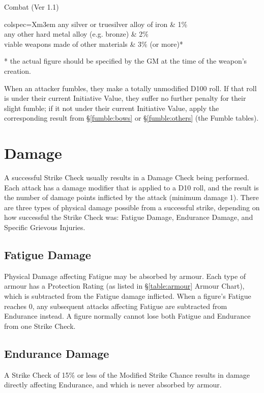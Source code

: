 \begin{Chapter}{Combat (Ver 1.1)}
\begin{dqtblr}{colspec={Xm{3em}}}
any silver or truesilver alloy of iron		& 1\% \\
any other hard metal alloy (e.g. bronze)	& 2\% \\ 
viable weapons made of other materials		& 3\% (or more)* \\
\end{dqtblr}

* the actual figure should be specified by the GM at the time of the
weapon’s creation.


When an attacker fumbles, they make a totally unmodified D100 roll.
If that roll is under their current Initiative Value, they suffer no
further penalty for their slight fumble; if it not under their current
Initiative Value, apply the corresponding result from
\S\ref{fumble:bows} or \S\ref{fumble:others} (the Fumble tables).

\section{Damage}
\label{combat:damage}

A successful Strike Check usually results in a Damage Check being
performed. Each attack has a damage modifier that is applied to a D10
roll, and the result is the number of damage points inflicted by the
attack (minimum damage 1). There are three types of physical damage
possible from a successful strike, depending on how successful the
Strike Check was: Fatigue Damage, Endurance Damage, and Specific
Grievous Injuries.

\subsection{Fatigue Damage}

Physical Damage affecting Fatigue may be absorbed by armour.  Each
type of armour has a Protection Rating (as listed in
\S\ref{table:armour} Armour Chart), which is subtracted from the
Fatigue damage inflicted.  When a figure’s Fatigue reaches 0, any
subsequent attacks affecting Fatigue are subtracted from Endurance
instead.  A figure normally cannot lose both Fatigue and Endurance from
one Strike Check.

\subsection{Endurance Damage}

A Strike Check of 15\% or less of the Modified Strike Chance results
in damage directly affecting Endurance, and which is never absorbed by
armour.


\end{Chapter}

